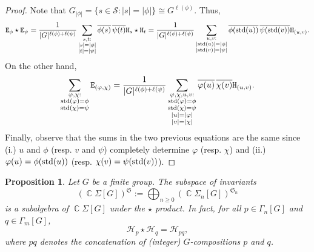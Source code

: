 \documentclass[11pt, oneside, reqno]{amsart}
\newtheorem{prop}[theorem]{Proposition}
\theoremstyle{definition}
\numberwithin{equation}{section}
\DeclareMathOperator{\C}{\mathbb{C}}
\def \SS{{\mathcal{S}}}
\def \kk{\C}
\def \ol{\overline}
\def \sym{\mathfrak{S}}
\newcommand{\B}[1]{\mathtt{#1}} 			%
\newcommand{\SB}[1]{\mathcal{#1}} 		%
\newcommand{\abs}[1]{|{#1}|} 				%
\begin{document}
\begin{proof}
    Note that $G_{\abs{\phi}} = \{ s \in \SS : \abs{s} = \abs{\phi} \} \cong G^{\ell(\phi)}$. Thus,
    \[
        \B{E}_\phi \star \B{E}_\psi =
        \dfrac{1}{|G|^{\ell(\phi)+\ell(\psi)}} \sum_{ \substack{ s,t: \\ \abs{s} = \abs{\phi} \\ \abs{t} = \abs{\psi} } } \ol{\phi(s)}  \, \ol{\psi(t)} \B{H}_s \star \B{H}_t =
        \dfrac{1}{|G|^{\ell(\phi)+\ell(\psi)}} \sum_{ \substack{ u,v: \\ \abs{ {\rm std}(u) } = \abs{\phi} \\ \abs{{\rm std}(v)} = \abs{\psi} } } \ol{\phi({\rm std}(u))}  \, \ol{\psi({\rm std}(v))} \B{H}_{(u,v)}.
    \]
    On the other hand,
    \[
        \sum_{ \substack{ \varphi,\chi : \\ {\rm std}(\varphi) = \phi \\ {\rm std}(\chi) = \psi } }  \B{E}_{(\varphi,\chi)} = 
        \dfrac{1}{|G|^{\ell(\phi)+\ell(\psi)}} \sum_{\substack{ \varphi,\chi,u,v : \\ {\rm std}(\varphi) = \phi \\ {\rm std}(\chi) = \psi \\ \abs{u} = \abs{\varphi} \\ \abs{v} = \abs{\chi} }} \ol{\varphi(u)}  \, \ol{\chi(v)} \B{H}_{(u,v)}.
    \]
    Finally, observe that the sums in the two previous equations are the same since (i.) $u$ and $\phi$ (resp. $v$ and $\psi$) completely determine $\varphi$ (resp. $\chi$) and (ii.) $\varphi(u) = \phi({\rm std}(u))$ (resp. $\chi(v) = \psi({\rm std}(v))$).
\end{proof}

\begin{prop}\label{prop:invar-star-subalg}
    Let $G$ be a finite group.
    The subspace of invariants 
    \[
        (\kk \Sigma[G])^{\sym} := \displaystyle\bigoplus_{n \geq 0} (\kk\Sigma_n[G])^{\sym_n}
    \]
    is a subalgebra of $\kk\Sigma[G]$ under the $\star$ product.
    In fact, for all $p \in \Gamma_n[G]$ and $q \in \Gamma_m[G]$,
    \[
        \SB{H}_{p} \star \SB{H}_{q} = \SB{H}_{pq},
    \]
    where $pq$ denotes the concatenation of (integer) $G$-compositions $p$ and $q$.
\end{prop}
\end{document}
